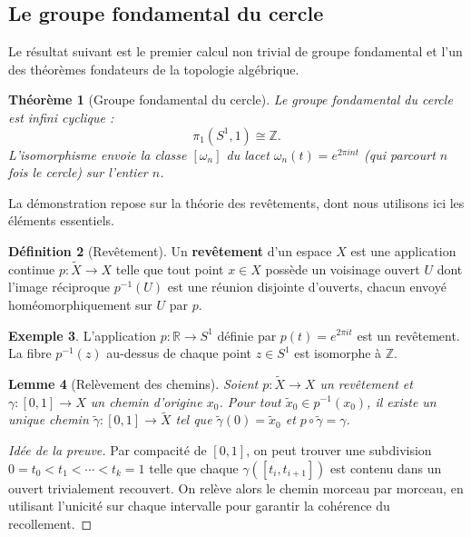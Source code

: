 \documentclass[12pt,a4paper,openany]{book}
\theoremstyle{definition}
\newtheorem{definition}{Définition}[chapter]
\newtheorem{exemple}[definition]{Exemple}
\theoremstyle{plain}
\newtheorem{theoreme}[definition]{Théorème}
\newtheorem{lemme}[definition]{Lemme}
\theoremstyle{remark}
\newcommand{\Z}{\mathbb{Z}}
\newcommand{\R}{\mathbb{R}}
\begin{document}
\subsection{Le groupe fondamental du cercle}\label{subsec:pi1-S1}

Le résultat suivant est le premier calcul non trivial de groupe fondamental et
l'un des théorèmes fondateurs de la topologie algébrique.

\begin{theoreme}[Groupe fondamental du cercle]\label{thm:pi1-S1}
Le groupe fondamental du cercle est infini cyclique :
\[
\pi_1(S^1, 1) \cong \Z.
\]
L'isomorphisme envoie la classe $[\omega_n]$ du lacet
$\omega_n(t) = e^{2\pi i n t}$ (qui parcourt $n$ fois le cercle) sur l'entier $n$.
\end{theoreme}

La démonstration repose sur la théorie des revêtements, dont nous utilisons ici
les éléments essentiels.

\begin{definition}[Revêtement]\label{def:revetement-apercu}
Un \textbf{revêtement} d'un espace $X$ est une application continue
$p : \widetilde{X} \to X$ telle que tout point $x \in X$ possède un voisinage
ouvert $U$ dont l'image réciproque $p^{-1}(U)$ est une réunion disjointe
d'ouverts, chacun envoyé homéomorphiquement sur $U$ par $p$.
\end{definition}

\begin{exemple}\label{ex:revetement-R-S1}
L'application $p : \R \to S^1$ définie par $p(t) = e^{2\pi i t}$ est un
revêtement. La fibre $p^{-1}(z)$ au-dessus de chaque point $z \in S^1$ est
isomorphe à $\Z$.
\end{exemple}

\begin{lemme}[Relèvement des chemins]\label{lem:relevement-chemins}
Soient $p : \widetilde{X} \to X$ un revêtement et $\gamma : [0,1] \to X$ un
chemin d'origine $x_0$. Pour tout $\widetilde{x}_0 \in p^{-1}(x_0)$, il existe
un unique chemin $\widetilde{\gamma} : [0,1] \to \widetilde{X}$ tel que
$\widetilde{\gamma}(0) = \widetilde{x}_0$ et
$p \circ \widetilde{\gamma} = \gamma$.
\end{lemme}

\begin{proof}[Idée de la preuve]
Par compacité de $[0,1]$, on peut trouver une subdivision
$0 = t_0 < t_1 < \cdots < t_k = 1$ telle que chaque $\gamma([t_i, t_{i+1}])$
est contenu dans un ouvert trivialement recouvert. On relève alors le chemin
morceau par morceau, en utilisant l'unicité sur chaque intervalle pour garantir
la cohérence du recollement.
\end{proof}
\end{document}
